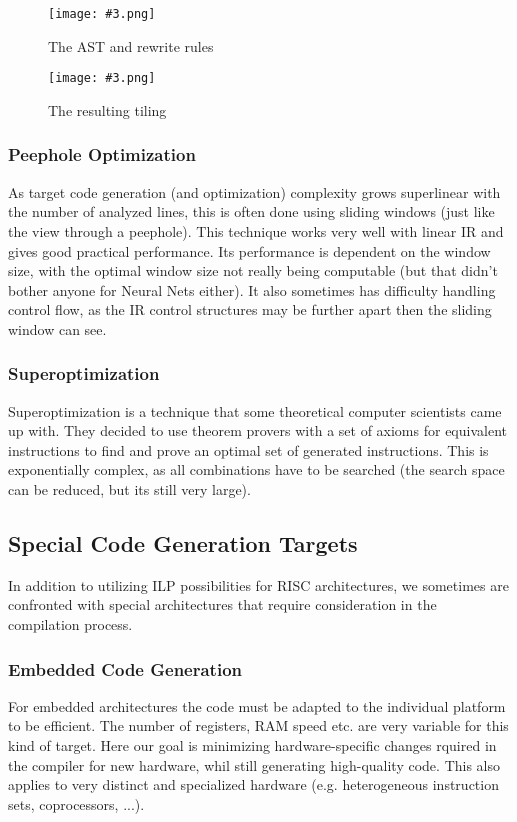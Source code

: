 \documentclass{article}
\newcommand{\fig}[4]{
	\begin{figure}[#1]
		\center
		\texttt{[image: \#3.png]}
		\caption{#4}
		\label{fig:#3}
	\end{figure}
	}
\begin{document}
\fig{h}{}{slideast}{The AST and rewrite rules}

\fig{h}{}{slidetiling}{The resulting tiling}

\subsubsection{Peephole Optimization}
As target code generation (and optimization) complexity grows superlinear with the number of analyzed lines, this is often done using sliding windows (just like the view through a peephole).
This technique works very well with linear IR and gives good practical performance.
Its performance is dependent on the window size, with the optimal window size not really being computable (but that didn't bother anyone for Neural Nets either).
It also sometimes has difficulty handling control flow, as the IR control structures may be further apart then the sliding window can see.

\subsubsection{Superoptimization}
Superoptimization is a technique that some theoretical computer scientists came up with.
They decided to use theorem provers with a set of axioms for equivalent instructions to find and prove an optimal set of generated instructions.
This is exponentially complex, as all combinations have to be searched (the search space can be reduced, but its still very large).
\subsection{Special Code Generation Targets}
In addition to utilizing ILP possibilities for RISC architectures, we sometimes are confronted with special architectures that require consideration in the compilation process.

\subsubsection{Embedded Code Generation}
For embedded architectures the code must be adapted to the individual platform to be efficient.
The number of registers, RAM speed etc. are very variable for this kind of target.
Here our goal is minimizing hardware-specific changes rquired in the compiler for new hardware, whil still generating high-quality code.
This also applies to very distinct and specialized hardware (e.g. heterogeneous instruction sets, coprocessors, ...).
\end{document}
